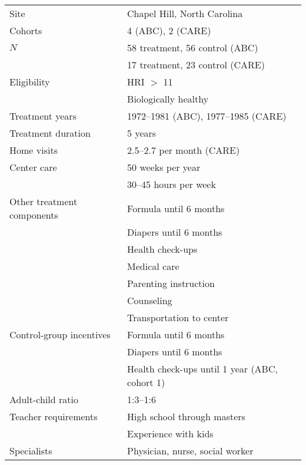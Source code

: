 \begin{tabular}{l l}
	\toprule
Site & Chapel Hill, North Carolina \\
Cohorts & 4 (ABC), 2 (CARE) \\
$N$ & 58 treatment, 56 control (ABC) \\
	& 17 treatment, 23 control (CARE) \\
\midrule
Eligibility & HRI $>$ 11 \\
		& Biologically healthy \\
\midrule
Treatment years & 1972--1981 (ABC), 1977--1985 (CARE) \\
Treatment duration & 5 years \\
\midrule
Home visits 	& 2.5--2.7	per month (CARE)	\\
Center care	& 50	weeks per year \\
		 	& 30--45 hours per week  \\
Other treatment components & Formula until 6 months\\
					& Diapers until 6 months \\ 
					& Health check-ups \\
					& Medical care \\
					& Parenting instruction \\
					& Counseling \\
					& Transportation to center \\
Control-group incentives & Formula until 6 months \\
				& Diapers until 6 months 	\\
				& Health check-ups until 1 year (ABC, cohort 1) \\
\midrule
Adult-child ratio & 1:3--1:6 \\
Teacher requirements & High school through masters \\
				& Experience with kids \\
Specialists & Physician, nurse, social worker \\
\bottomrule
\end{tabular}


